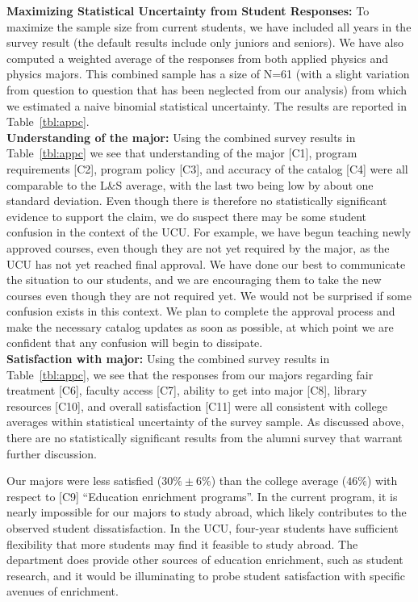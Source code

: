 \documentclass[12pt]{article}
\begin{document}
\noindent
{\bf Maximizing Statistical Uncertainty from Student Responses:}
To maximize the sample size from current students, we have included
all years in the survey result (the default results include only
juniors and seniors).  We have also computed a weighted average of the
responses from both applied physics and physics majors.  This combined
sample has a size of N=61 (with a slight variation from question to
question that has been neglected from our analysis) from which we
estimated a naive binomial statistical uncertainty.  The results are
reported in Table~\ref{tbl:appc}.\\[3pt]

\noindent
{\bf Understanding of the major:} Using the combined survey results in
Table~\ref{tbl:appc} we see that understanding of the major [C1],
program requirements [C2], program policy [C3], and accuracy of the
catalog [C4] were all comparable to the L\&S average, with the last
two being low by about one standard deviation.  Even though there is
therefore no statistically significant evidence to support the claim,
we do suspect there may be some student confusion in the context of
the UCU.  For example, we have begun teaching newly approved courses,
even though they are not yet required by the major, as the UCU has not
yet reached final approval.  We have done our best to communicate the
situation to our students, and we are encouraging them to take the new
courses even though they are not required yet.  We would not be
surprised if some confusion exists in this context.  We plan to
complete the approval process and make the necessary catalog updates
as soon as possible, at which point we are confident that any
confusion will begin to dissipate.\\[3pt]

\noindent
{\bf Satisfaction with major:} Using the combined survey results in
Table~\ref{tbl:appc}, we see that the responses from our majors regarding
fair treatment [C6], faculty access [C7], ability to get into major
[C8], library resources [C10], and overall satisfaction [C11] were all
consistent with college averages within statistical uncertainty of the
survey sample.  As discussed above, there are no statistically
significant results from the alumni survey that warrant further discussion.

Our majors were less satisfied ($30\% \pm 6\%$) than the college
average ($46\%$) with respect to [C9] ``Education enrichment
programs''.  In the current program, it is nearly impossible for our
majors to study abroad, which likely contributes to the observed
student dissatisfaction.  In the UCU, four-year students have
sufficient flexibility that more students may find it feasible to
study abroad.  The department does provide other sources of education
enrichment, such as student research, and it would be illuminating to
probe student satisfaction with specific avenues of enrichment.
\end{document}
